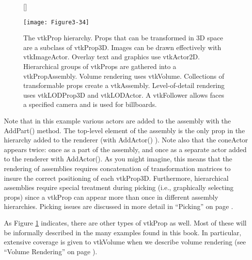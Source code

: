 \begin{figure}[!htb]
[\FBwidth]
{\caption{The vtkProp hierarchy.
Props that can be transformed in 3D space are a subclass of
vtkProp3D. Images can be drawn effectively with vtkImageActor.
Overlay text and graphics use vtkActor2D. Hierarchical groups
of vtkProps are gathered into a vtkPropAssembly. Volume rendering
uses vtkVolume. Collections of transformable props create a
vtkAssembly. Level-of-detail rendering uses vtkLODProp3D and
vtkLODActor. A vtkFollower allows faces a specified camera
and is used for billboards.}\label{fig:Figure3-34}}
{\texttt{[image: Figure3-34]}}
\end{figure}


Note that in this example various actors are added to the assembly with the AddPart() method. The top-level element of the assembly is the only prop in the hierarchy added to the renderer (with AddActor() ). Note also that the coneActor appears twice: once as a part of the assembly, and once as a separate actor added to the renderer with AddActor(). As you might imagine, this means that the rendering of assemblies requires concatenation of transformation matrices to insure the correct positioning of each vtkProp3D. Furthermore, hierarchical assemblies require special treatment during picking (i.e., graphically selecting props) since a vtkProp can appear more than once in different assembly hierarchies. Picking issues are discussed in more detail in ``Picking'' on page \pageref{subsec:picking}.

As Figure \ref{fig:Figure3-34} indicates, there are other types of vtkProp as well. Most of these will be informally described in the many examples found in this book. In particular, extensive coverage is given to vtkVolume when we describe volume rendering (see ``Volume Rendering'' on page \pageref{sec:volume_rendering}).


